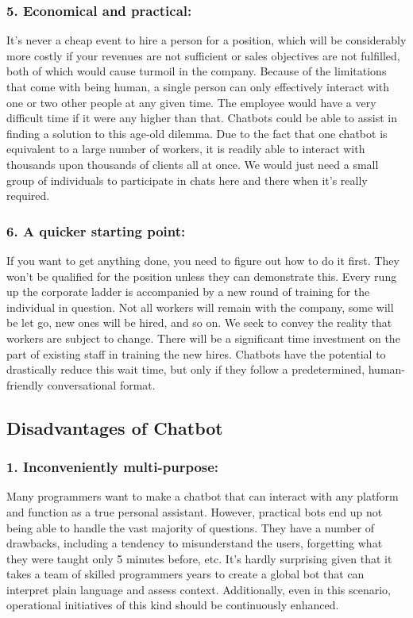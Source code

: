 \subsubsection{5. Economical and practical:}
It's never a cheap event to hire a person for a position, which will be considerably more costly if your revenues are not sufficient or sales objectives are not fulfilled, both of which would cause turmoil in the company. Because of the limitations that come with being human, a single person can only effectively interact with one or two other people at any given time. The employee would have a very difficult time if it were any higher than that. Chatbots could be able to assist in finding a solution to this age-old dilemma. Due to the fact that one chatbot is equivalent to a large number of workers, it is readily able to interact with thousands upon thousands of clients all at once. We would just need a small group of individuals to participate in chats here and there when it's really required.

\subsubsection{6. A quicker starting point:}
If you want to get anything done, you need to figure out how to do it first. They won't be qualified for the position unless they can demonstrate this. Every rung up the corporate ladder is accompanied by a new round of training for the individual in question. Not all workers will remain with the company, some will be let go, new ones will be hired, and so on. We seek to convey the reality that workers are subject to change. There will be a significant time investment on the part of existing staff in training the new hires. Chatbots have the potential to drastically reduce this wait time, but only if they follow a predetermined, human-friendly conversational format.

\subsection{Disadvantages of Chatbot}

\subsubsection{1. Inconveniently multi-purpose:}
Many programmers want to make a chatbot that can interact with any platform and function as a true personal assistant. However, practical bots end up not being able to handle the vast majority of questions. They have a number of drawbacks, including a tendency to misunderstand the users, forgetting what they were taught only 5 minutes before, etc. It's hardly surprising given that it takes a team of skilled programmers years to create a global bot that can interpret plain language and assess context. Additionally, even in this scenario, operational initiatives of this kind should be continuously enhanced.


